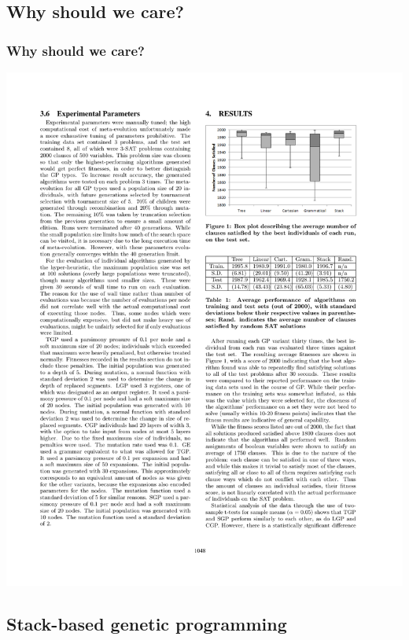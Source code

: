 \documentclass{beamer}
\newcommand{\linespace}{\vskip 0.25cm}
\begin{document}
\subsection{Why should we care?}
\begin{frame}
	\frametitle{Why should we care?}
	\includegraphics[width=1\textwidth]{Illustrations/gpvariant_graph.PDF}
	\linespace
	\centering
\end{frame}

\subsection{Stack-based genetic programming}
\end{document}
